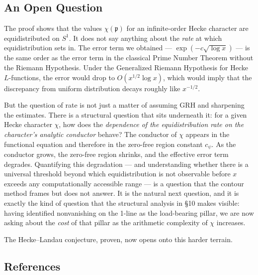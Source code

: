 \documentclass[12pt,a4paper]{article}
\newcommand{\pilcrow}{\S}
\begin{document}
\subsection{An Open Question}

The proof shows that the values $\chi(\mathfrak{p})$ for an infinite-order Hecke character are equidistributed on $S^1$. It does not say anything about the \emph{rate} at which equidistribution sets in. The error term we obtained --- $\exp(-c\sqrt{\log x})$ --- is the same order as the error term in the classical Prime Number Theorem without the Riemann Hypothesis. Under the Generalized Riemann Hypothesis for Hecke $L$-functions, the error would drop to $O(x^{1/2} \log x)$, which would imply that the discrepancy from uniform distribution decays roughly like $x^{-1/2}$.

But the question of rate is not just a matter of assuming GRH and sharpening the estimates. There is a structural question that sits underneath it: for a given Hecke character $\chi$, how does the \emph{dependence of the equidistribution rate on the character's analytic conductor} behave? The conductor of $\chi$ appears in the functional equation and therefore in the zero-free region constant $c_{\psi}$. As the conductor grows, the zero-free region shrinks, and the effective error term degrades. Quantifying this degradation --- and understanding whether there is a universal threshold beyond which equidistribution is not observable before $x$ exceeds any computationally accessible range --- is a question that the contour method frames but does not answer. It is the natural next question, and it is exactly the kind of question that the structural analysis in \pilcrow{}10 makes visible: having identified nonvanishing on the 1-line as the load-bearing pillar, we are now asking about the \emph{cost} of that pillar as the arithmetic complexity of $\chi$ increases.

The Hecke--Landau conjecture, proven, now opens onto this harder terrain.

\subsection{References}
\end{document}
